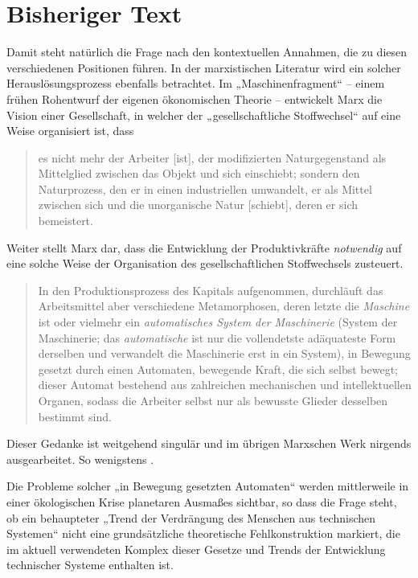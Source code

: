 \documentclass[11pt,a4paper]{article}
\begin{document}
\section{Bisheriger Text}

Damit steht natürlich die Frage nach den kontextuellen Annahmen, die zu diesen
verschiedenen Positionen führen. In der marxistischen Literatur wird ein
solcher Herauslösungsprozess ebenfalls betrachtet.  Im „Maschinenfragment“
\cite[S. 570 ff.]{MEW42} -- einem frühen Rohentwurf der eigenen ökonomischen
Theorie -- entwickelt Marx die Vision einer Gesellschaft, in welcher der
„gesellschaftliche Stoffwechsel“ \cite[S. 37]{MEW23} auf eine Weise
organisiert ist, dass
\begin{quote}
  es nicht mehr der Arbeiter [ist], der modifizierten Naturgegenstand als
  Mittelglied zwischen das Objekt und sich einschiebt; sondern den
  Naturprozess, den er in einen industriellen umwandelt, er als Mittel
  zwischen sich und die unorganische Natur [schiebt], deren er sich
  bemeistert.  \cite[S. 572]{MEW42}
\end{quote}
Weiter stellt Marx dar, dass die Entwicklung der Produktivkräfte
\emph{notwendig} auf eine solche Weise der Organisation des gesellschaftlichen
Stoffwechsels zusteuert.
\begin{quote}
  In den Produktionsprozess des Kapitals aufgenommen, durchläuft das
  Arbeitsmittel aber verschiedene Metamorphosen, deren letzte die
  \emph{Maschine} ist oder vielmehr ein \emph{automatisches System der
    Maschinerie} (System der Maschinerie; das \emph{automatische} ist nur die
  vollendetste adäquateste Form derselben und verwandelt die Maschinerie erst
  in ein System), in Bewegung gesetzt durch einen Automaten, bewegende Kraft,
  die sich selbst bewegt; dieser Automat bestehend aus zahlreichen mechanischen
  und intellektuellen Organen, sodass die Arbeiter selbst nur als bewusste
  Glieder desselben bestimmt sind. \cite[S. 584]{MEW42}
\end{quote}
Dieser Gedanke ist weitgehend singulär und im übrigen Marxschen Werk nirgends
ausgearbeitet. So wenigstens \cite{Goldberg2016}.

Die Probleme solcher „in Bewegung gesetzten Automaten“ werden mittlerweile in
einer ökolo\-gischen Krise planetaren Ausmaßes sichtbar, so dass die Frage
steht, ob ein behaupteter „Trend der Verdrängung des Menschen aus technischen
Systemen“ nicht eine grundsätzliche theoretische Fehlkonstruktion markiert,
die im aktuell verwendeten Komplex dieser Gesetze und Trends der Entwicklung
technischer Systeme enthalten ist. 
\end{document}
